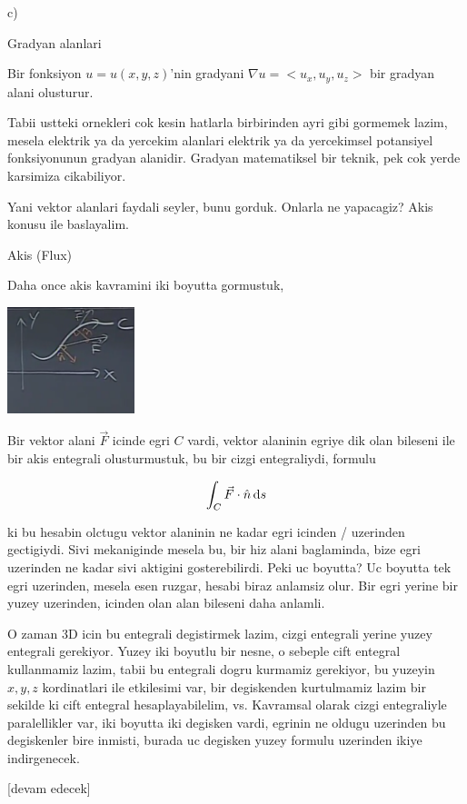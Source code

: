 \documentclass[12pt,fleqn]{article}\usepackage{../../common}
\begin{document}
c)

Gradyan alanlari

Bir fonksiyon $u = u(x,y,z)$'nin gradyani $\nabla u = < u_x, u_y, u_z >$
bir gradyan alani olusturur.

Tabii ustteki ornekleri cok kesin hatlarla birbirinden ayri gibi gormemek lazim,
mesela elektrik ya da yercekim alanlari elektrik ya da yercekimsel potansiyel
fonksiyonunun gradyan alanidir. Gradyan matematiksel bir teknik, pek cok
yerde karsimiza cikabiliyor.

Yani vektor alanlari faydali seyler, bunu gorduk. Onlarla ne yapacagiz?
Akis konusu ile baslayalim.

Akis (Flux)

Daha once akis kavramini iki boyutta gormustuk,

\includegraphics[width=10em]{calc_multi_27_02.png}

Bir vektor alani $\vec{F}$ icinde egri $C$ vardi, vektor alaninin
egriye dik olan bileseni ile bir akis entegrali olusturmustuk, bu
bir cizgi entegraliydi, formulu

$$
\int_C \vec{F} \cdot \hat{n} \,\mathrm{d} s
$$

ki bu hesabin olctugu vektor alaninin ne kadar egri icinden / uzerinden
gectigiydi. Sivi mekaniginde mesela bu, bir hiz alani baglaminda, bize egri
uzerinden ne kadar sivi aktigini gosterebilirdi. Peki uc boyutta? Uc boyutta tek
egri uzerinden, mesela esen ruzgar, hesabi biraz anlamsiz olur. Bir egri yerine
bir yuzey uzerinden, icinden olan alan bileseni daha anlamli.

O zaman 3D icin bu entegrali degistirmek lazim, cizgi entegrali yerine yuzey
entegrali gerekiyor.  Yuzey iki boyutlu bir nesne, o sebeple cift entegral
kullanmamiz lazim, tabii bu entegrali dogru kurmamiz gerekiyor, bu yuzeyin
$x,y,z$ kordinatlari ile etkilesimi var, bir degiskenden kurtulmamiz lazim bir
sekilde ki cift entegral hesaplayabilelim, vs. Kavramsal olarak cizgi
entegraliyle paralellikler var, iki boyutta iki degisken vardi, egrinin ne
oldugu uzerinden bu degiskenler bire inmisti, burada uc degisken yuzey formulu
uzerinden ikiye indirgenecek.















[devam edecek]
\end{document}
